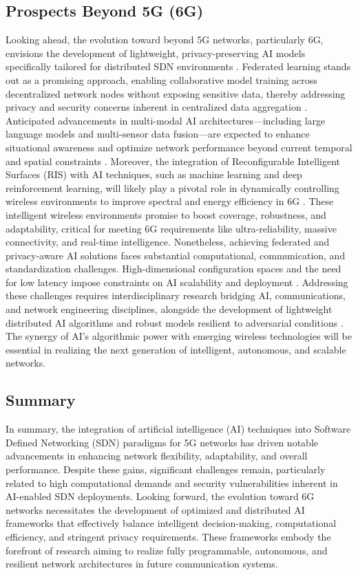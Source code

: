 \documentclass[sigconf]{acmart}
\begin{document}
\subsection{Prospects Beyond 5G (6G)}

Looking ahead, the evolution toward beyond 5G networks, particularly 6G, envisions the development of lightweight, privacy-preserving AI models specifically tailored for distributed SDN environments \cite{ref49,ref50}. Federated learning stands out as a promising approach, enabling collaborative model training across decentralized network nodes without exposing sensitive data, thereby addressing privacy and security concerns inherent in centralized data aggregation \cite{ref52}. Anticipated advancements in multi-modal AI architectures—including large language models and multi-sensor data fusion—are expected to enhance situational awareness and optimize network performance beyond current temporal and spatial constraints \cite{ref52}.  
Moreover, the integration of Reconfigurable Intelligent Surfaces (RIS) with AI techniques, such as machine learning and deep reinforcement learning, will likely play a pivotal role in dynamically controlling wireless environments to improve spectral and energy efficiency in 6G \cite{ref49}. These intelligent wireless environments promise to boost coverage, robustness, and adaptability, critical for meeting 6G requirements like ultra-reliability, massive connectivity, and real-time intelligence.  
Nonetheless, achieving federated and privacy-aware AI solutions faces substantial computational, communication, and standardization challenges. High-dimensional configuration spaces and the need for low latency impose constraints on AI scalability and deployment \cite{ref49,ref50}. Addressing these challenges requires interdisciplinary research bridging AI, communications, and network engineering disciplines, alongside the development of lightweight distributed AI algorithms and robust models resilient to adversarial conditions \cite{ref49,ref50,ref52}. The synergy of AI's algorithmic power with emerging wireless technologies will be essential in realizing the next generation of intelligent, autonomous, and scalable networks.

\subsection{Summary}

In summary, the integration of artificial intelligence (AI) techniques into Software Defined Networking (SDN) paradigms for 5G networks has driven notable advancements in enhancing network flexibility, adaptability, and overall performance. Despite these gains, significant challenges remain, particularly related to high computational demands and security vulnerabilities inherent in AI-enabled SDN deployments. Looking forward, the evolution toward 6G networks necessitates the development of optimized and distributed AI frameworks that effectively balance intelligent decision-making, computational efficiency, and stringent privacy requirements. These frameworks embody the forefront of research aiming to realize fully programmable, autonomous, and resilient network architectures in future communication systems.
\end{document}
